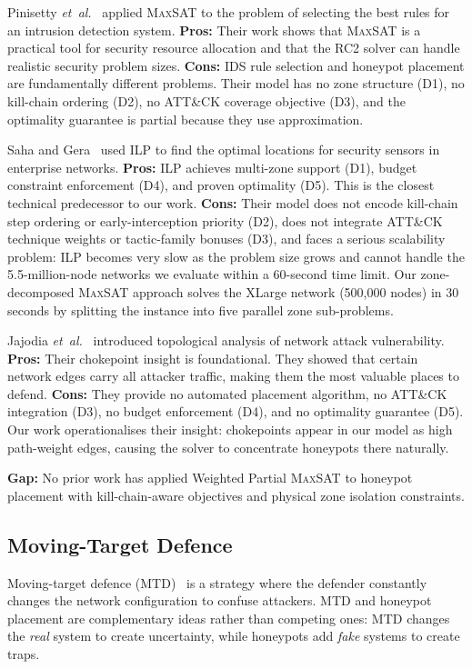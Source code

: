 \documentclass[journal]{IEEEtran}
\newcommand{\etal}{\emph{et~al.}}
\newcommand{\maxsat}{\textsc{MaxSAT}}
\begin{document}
Pinisetty \etal{}~\cite{pinisetty2017} applied \maxsat{} to
the problem of selecting the best rules for an intrusion
detection system.
\textbf{Pros:} Their work shows that \maxsat{} is a
practical tool for security resource allocation and that the
RC2 solver can handle realistic security problem sizes.
\textbf{Cons:} IDS rule selection and honeypot placement
are fundamentally different problems.
Their model has no zone structure (D1), no kill-chain
ordering (D2), no ATT\&CK coverage objective (D3), and
the optimality guarantee is partial because they use
approximation.

Saha and Gera~\cite{saha2015} used ILP to find the optimal
locations for security sensors in enterprise networks.
\textbf{Pros:} ILP achieves multi-zone support (D1), budget
constraint enforcement (D4), and proven optimality (D5).
This is the closest technical predecessor to our work.
\textbf{Cons:} Their model does not encode kill-chain step
ordering or early-interception priority (D2), does not
integrate ATT\&CK technique weights or tactic-family bonuses
(D3), and faces a serious scalability problem: ILP becomes
very slow as the problem size grows and cannot handle the
5.5-million-node networks we evaluate within a 60-second
time limit.
Our zone-decomposed \maxsat{} approach solves the XLarge
network (500,000 nodes) in 30 seconds by splitting the
instance into five parallel zone sub-problems.

Jajodia \etal{}~\cite{jajodia2005} introduced topological
analysis of network attack vulnerability.
\textbf{Pros:} Their chokepoint insight is foundational.
They showed that certain network edges carry all attacker
traffic, making them the most valuable places to defend.
\textbf{Cons:} They provide no automated placement
algorithm, no ATT\&CK integration (D3), no budget
enforcement (D4), and no optimality guarantee (D5).
Our work operationalises their insight: chokepoints appear
in our model as high path-weight edges, causing the solver
to concentrate honeypots there naturally.

\textbf{Gap:} No prior work has applied Weighted Partial
\maxsat{} to honeypot placement with kill-chain-aware
objectives and physical zone isolation constraints.

\subsection{Moving-Target Defence}

Moving-target defence (MTD)~\cite{zhu2013} is a strategy
where the defender constantly changes the network
configuration to confuse attackers.
MTD and honeypot placement are complementary ideas rather
than competing ones: MTD changes the \emph{real} system to
create uncertainty, while honeypots add \emph{fake} systems
to create traps.
\end{document}
